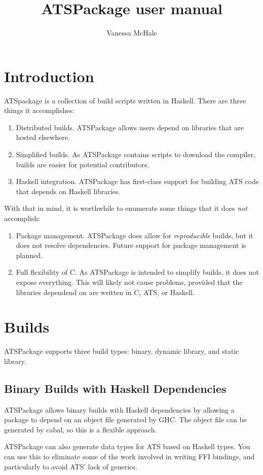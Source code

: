 \documentclass{article}
\begin{document}
\title{ATSPackage user manual}
\author{Vanessa McHale}
\maketitle

\tableofcontents

\section{Introduction}

ATSpackage is a collection of build scripts written in Haskell. There are three
things it accomplishes:

\begin{enumerate}
  \item Distributed builds. ATSPackage allows users depend on libraries that are
    hosted elsewhere.
  \item Simplified builds. As ATSPackage contains scripts to download the
    compiler, builds are easier for potential contributors.
  \item Haskell integration. ATSPackage has first-class support for building ATS
    code that depends on Haskell libraries. 
\end{enumerate}

With that in mind, it is worthwhile to enumerate some things that it does
\textit{not} accomplish:

\begin{enumerate}
  \item Package management. ATSPackage does allow for \textit{reproducible}
    builds, but it does not resolve dependencies. Future support for package
    management is planned.
  \item Full flexibility of C. As ATSPackage is intended to simplify builds, it
    does not expose everything. This will likely not cause problems, provided
    that the libraries dependend on are written in C, ATS, or Haskell.
\end{enumerate}

\section{Builds}

ATSPackage supports three build types: binary, dynamic library, and static
library.

\subsection{Binary Builds with Haskell Dependencies}

ATSPackage allows binary builds with Haskell dependencies by allowing a package
to depend on an object file generated by GHC. The object file can be generated
by cabal, so this is a flexible approach.

ATSPackage can also generate data types for ATS based on Haskell types. You can
use this to eliminate some of the work involved in writing FFI bindings, and
particularly to avoid ATS' lack of generics.
\end{document}
